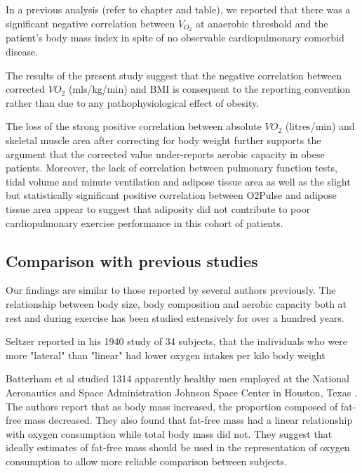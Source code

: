 In a previous analysis (refer to chapter and table), we reported that there was a significant negative correlation between $\dot{V}_{O_2}$ at anaerobic threshold and the patient's body mass index in spite of no observable cardiopulmonary comorbid disease. 

The results of the present study suggest that the negative correlation between corrected $VO_{2}$ (mls/kg/min) and BMI is consequent to the reporting convention rather than due to any pathophysiological effect of obesity. 

The loss of the strong positive correlation between absolute $VO_{2}$ (litres/min) and skeletal muscle area after correcting for body weight further supports the argument that the corrected value under-reports aerobic capacity in obese patients. Moreover, the lack of correlation between pulmonary function tests, tidal volume and minute ventilation and adipose tissue area as well as the slight but statistically significant positive correlation between O2Pulse and adipose tissue area appear to suggest that adiposity did not contribute to poor cardiopulmonary exercise performance in this cohort of patients.

\subsection{Comparison with previous studies}
Our findings are similar to those reported by several authors previously. The relationship between body size, body composition and aerobic capacity both at rest and during exercise has been studied extensively for over a hundred years. 

Seltzer reported in his 1940 study of 34 subjects, that the individuals who were more "lateral" than "linear" had lower oxygen intakes per kilo body weight 

Batterham et al studied 1314 apparently healthy men employed at the National Aeronautics and Space Administration Johnson Space Center in Houston, Texas \parencite{batterham_modeling_1999}. The authors report that as body mass increased, the proportion composed of fat-free mass decreased. They also found that fat-free mass had a linear relationship with oxygen consumption while total body mass did not. They suggest that ideally estimates of fat-free mass should be used in the representation of oxygen consumption to allow more reliable comparison between subjects. 

